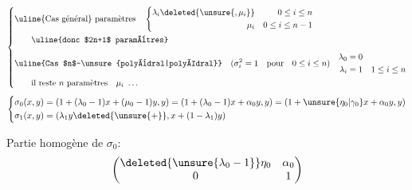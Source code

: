 \[
\left\{\begin{aligned}
&\text{\uline{Cas général} paramètres}\quad
\left\{\begin{aligned}\lambda_i\deleted{\unsure{,\mu_i}}&&0\leq i\leq n\\\mu_i&&0\leq i\leq n-1\end{aligned}\right.\\
&\qquad\text{\uline{donc $2n+1$ paramètres}}\\[1ex]
&\text{\uline{Cas $n$-\unsure{polyèdral|polyédral}}}\quad(\sigma_i^2=1\quad\text{pour}\quad0\leq i\leq n)\quad
\begin{aligned}\lambda_0&=0\\\lambda_i&=1\quad1\leq i\leq n\end{aligned}\\
&\qquad\text{il reste $n$ paramètres}\quad\mu_i\ \ldots
\end{aligned}\right.
\]
\[
\left\{\begin{aligned}
\sigma_0(x,y)&=(1+(\lambda_0-1)x+(\mu_0-1)y,y)=(1+(\lambda_0-1)x+\alpha_0y,y)=(1+\unsure{\eta_0|\gamma_0}x+\alpha_0y,y)\\
\sigma_1(x,y)&=(\lambda_1y\deleted{\unsure{+}},x+(1-\lambda_1)y)
\end{aligned}\right.
\]

Partie homogène de $\sigma_0$:
\[
\begin{pmatrix}\deleted{\unsure{\lambda_0-1}}\eta_0&\alpha_0\\0&1\end{pmatrix}
\]

